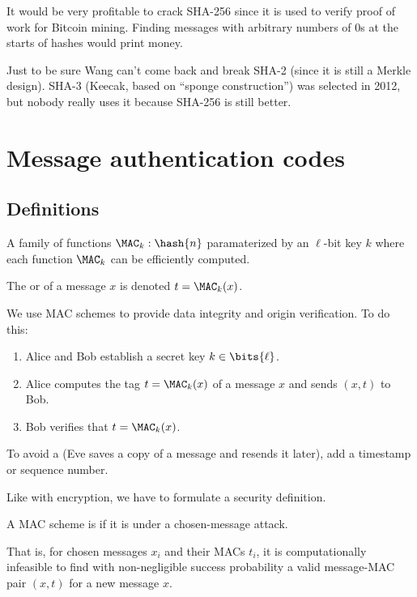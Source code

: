 \documentclass[class=co487,tikz,minted,notes]{agony}
\begin{document}
It would be very profitable to crack SHA-256 since it is used to
verify proof of work for Bitcoin mining.
Finding messages with arbitrary numbers of 0s at the starts of hashes would print money.

Just to be sure Wang can't come back and break SHA-2 (since it is still a Merkle design).
SHA-3 (Keecak, based on ``sponge construction'') was selected in 2012,
but nobody really uses it because SHA-256 is still better.

\chapter{Message authentication codes}

\section{Definitions}

\begin{defn}
  A family of functions $\MAC_k : \hash{n}$ paramaterized by an $\ell$-bit key $k$
  where each function $\MAC_k$ can be efficiently computed.

  The  or  of a message $x$ is denoted $t = \MAC_k(x)$.
\end{defn}

We use MAC schemes to provide data integrity and origin verification.
To do this:
\begin{enumerate}[nosep]
  \item Alice and Bob establish a secret key $k \in \bits{\ell}$.
  \item Alice computes the tag $t = \MAC_k(x)$ of a message $x$ and sends $(x,t)$ to Bob.
  \item Bob verifies that $t = \MAC_k(x)$.
\end{enumerate}
To avoid a 
(Eve saves a copy of a message and resends it later),
add a timestamp or sequence number.

Like with encryption, we have to formulate a security definition.

\begin{defn*}
  A MAC scheme is 
  if it is  under a chosen-message attack.

  That is, for chosen messages $x_i$ and their MACs $t_i$,
  it is computationally infeasible to find with non-negligible success probability
  a valid message-MAC pair $(x,t)$ for a new message $x$.
\end{defn*}
\end{document}
